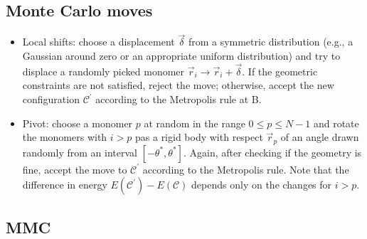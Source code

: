 \documentclass[../main.tex]{subfiles}
\begin{document}
\subsection*{Monte Carlo moves}

\begin{itemize}
    \item Local shifts: choose a displacement $\vec{\delta}$ from a symmetric distribution (e.g., a Gaussian around zero or
    an appropriate uniform distribution) and try to displace a randomly picked monomer $\vec{r}_{i}\rightarrow\vec{r}_{i}+\vec{\delta}.$ If
    the geometric constraints are not satisfied, reject the move; otherwise, accept the new configuration $\mathcal{C}^{\prime}$ 
    according to the Metropolis rule at B.

    \item Pivot: choose a monomer $p$ at random in the range $0\le p\le N-1$ and rotate the monomers
    with $i>p$ pas a rigid body with respect $\vec{r}_{p}$ of an angle  drawn randomly from an interval $[-\theta^{*},\theta^{*}]$.
    Again, after checking if the geometry is fine, accept the move to $\mathcal{C}^{\prime}$ according to the Metropolis rule.
    Note that the difference in energy $E(\mathcal{C}^{\prime})-E(\mathcal{C})$ depends only on the changes for $i>p$.
\end{itemize}

\subsection*{MMC}
\end{document}
